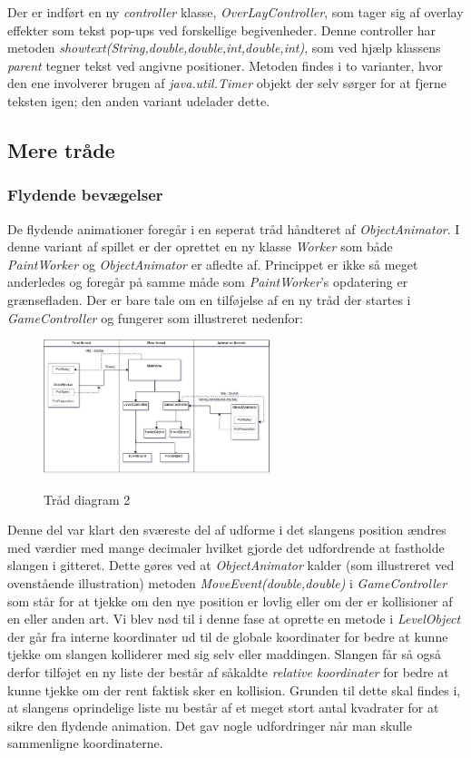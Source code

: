 \documentclass[]{article}
\begin{document}
	Der er indført en ny \textit{controller} klasse, \textit{OverLayController}, som tager sig af overlay effekter som tekst pop-ups ved forskellige begivenheder. Denne controller har metoden \textit{showtext(String,double,double,int,double,int)}, som ved hjælp klassens \textit{parent} tegner tekst ved angivne positioner. Metoden findes i to varianter, hvor den ene involverer brugen af \textit{java.util.Timer} objekt der selv sørger for at fjerne teksten igen; den anden variant udelader dette.
	
	\subsection{Mere tråde}
	\subsubsection{Flydende bevægelser}
	
	De flydende animationer foregår i en seperat tråd håndteret af \textit{ObjectAnimator}. I denne variant af spillet er der oprettet en ny klasse \textit{Worker} som både \textit{PaintWorker} og \textit{ObjectAnimator} er afledte af. Princippet er ikke så meget anderledes og foregår på samme måde som \textit{PaintWorker}'s opdatering er grænsefladen. Der er bare tale om en tilføjelse af en ny tråd der startes i \textit{GameController} og fungerer som illustreret nedenfor:
	
	\begin{figure}[h!]
		\centering
		\includegraphics[width=250px]{Thread_diagram_2.jpg}
		\label{fig:thread2}
		\caption{Tråd diagram 2}
	\end{figure}
	
	Denne del var klart den sværeste del af udforme i det slangens position ændres med værdier med mange decimaler hvilket gjorde det udfordrende at fastholde slangen i gitteret. Dette gøres ved at \textit{ObjectAnimator} kalder (som illustreret ved ovenstående illustration) metoden \textit{MoveEvent(double,double)} i \textit{GameController} som står for at tjekke om den nye position er lovlig eller om der er kollisioner af en eller anden art. Vi blev nød til i denne fase at oprette en metode i \textit{LevelObject} der går fra interne koordinater ud til de globale koordinater for bedre at kunne tjekke om slangen kolliderer med sig selv eller maddingen. Slangen får så også derfor tilføjet en ny liste der består af såkaldte \textit{relative koordinater} for bedre at kunne tjekke om der rent faktisk sker en kollision. Grunden til dette skal findes i, at slangens oprindelige liste nu består af et meget stort antal kvadrater for at sikre den flydende animation. Det gav nogle udfordringer når man skulle sammenligne koordinaterne.\\
	
\end{document}
